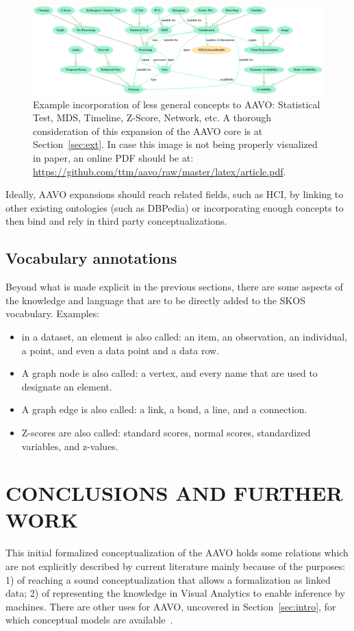 \documentclass[12pt,fleqn]{article}
\begin{document}
\begin{figure}[!htbp] %
\vspace{-2pt}
\begin{center}
\includegraphics[width=\textwidth]{../figs/aavo0.01_exemplified}
    \caption{Example incorporation of less general concepts to AAVO: Statistical Test, MDS, Timeline, Z-Score, Network, etc.
	A thorough consideration of this expansion of the AAVO core is at Section~\ref{sec:ext}.
	In case this image is not being properly visualized in paper,
	an online PDF should be at: \url{https://github.com/ttm/aavo/raw/master/latex/article.pdf}.}
\label{fig:exemp}%
\end{center}
\end{figure}

Ideally, AAVO expansions should reach related fields, such as HCI,
by linking to other existing ontologies (such as DBPedia) or incorporating
enough concepts to then bind and rely in third party conceptualizations.

\subsection{Vocabulary annotations}\label{sec:voc}
Beyond what is made explicit in the previous sections,
there are some aspects of the knowledge and language that
are to be directly added to the SKOS vocabulary.
Examples:
\begin{itemize}
	\item in a dataset, an element is also called: an item, an observation, an individual, a point,
		and even a data point and a data row. 
	\item A graph node is also called: a vertex, and every name that are used to designate an element.
	\item A graph edge is also called: a link, a bond, a line, and a connection.
	\item Z-scores are also called: standard scores, normal scores, standardized variables, and z-values. 
\end{itemize}

\section{CONCLUSIONS AND FURTHER WORK}\label{sec:con}
This initial formalized conceptualization of the AAVO
holds some relations which are not explicitly described by
current literature mainly because of the purposes:
1) of reaching a sound
conceptualization that allows a formalization as linked data;
2) of representing the knowledge in Visual Analytics
to enable inference by machines.
There are other uses for AAVO, uncovered in Section~\ref{sec:intro},
for which conceptual models are available~\citep{munzner,ward}.
\end{document}
